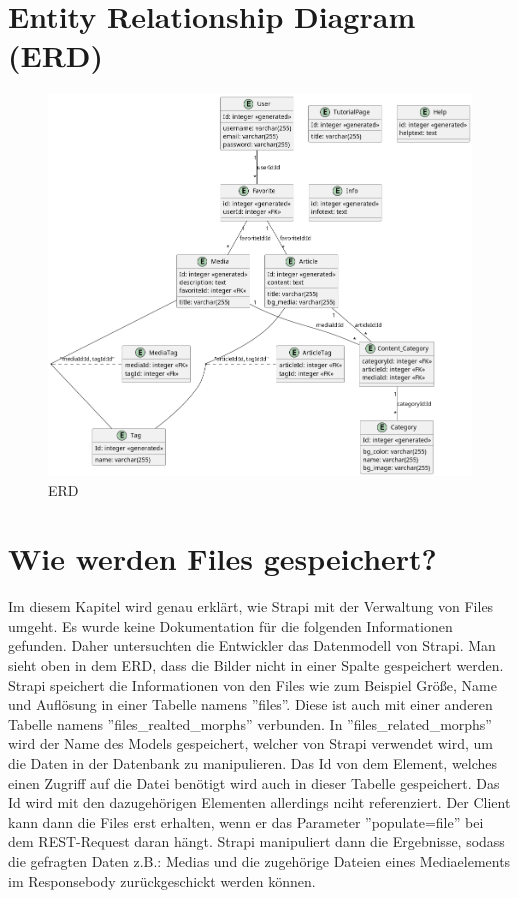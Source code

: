 \section{\textbf{E}ntity \textbf{R}elationship \textbf{D}iagram (ERD)}
\begin{spacing}{1}

  \begin{figure}[H]
    \centering
    \includegraphics[height=1\textwidth]{./pics/erd.png}
    \caption{ERD}

  \end{figure}
\end{spacing}

\section{Wie werden Files gespeichert?}
Im diesem Kapitel wird genau erklärt, wie Strapi mit der Verwaltung von Files umgeht. Es wurde keine Dokumentation für die folgenden Informationen gefunden. Daher untersuchten die Entwickler das Datenmodell von  Strapi.
Man sieht oben in dem ERD,
dass die Bilder nicht in einer Spalte gespeichert werden. Strapi speichert die Informationen von den Files wie zum Beispiel Größe, Name und Auflösung in einer Tabelle namens ''files''.
Diese ist auch mit einer anderen Tabelle namens ''files\_realted\_morphs'' verbunden. In ''files\_related\_morphs'' wird der Name des Models gespeichert, welcher von Strapi verwendet wird, um die Daten in der Datenbank zu manipulieren. Das Id von dem Element, welches einen Zugriff auf die Datei benötigt wird auch in dieser Tabelle gespeichert. Das Id wird mit den dazugehörigen Elementen allerdings nciht referenziert.
Der Client kann dann die Files erst erhalten, wenn er das Parameter ''populate=file'' bei dem REST-Request daran hängt. Strapi manipuliert dann die Ergebnisse, sodass die gefragten Daten z.B.: Medias und die zugehörige Dateien eines Mediaelements im Responsebody zurückgeschickt werden können.

